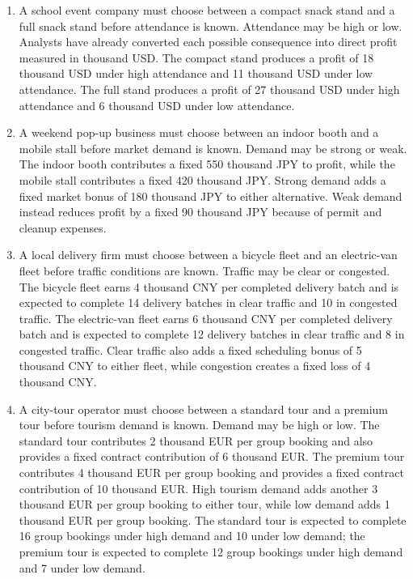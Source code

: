 	\begin{enumerate}[leftmargin=0.22in]
		
		\item
		A school event company must choose between a compact snack stand and a full snack stand before attendance is known. Attendance may be high or low. Analysts have already converted each possible consequence into direct profit measured in thousand USD. The compact stand produces a profit of 18 thousand USD under high attendance and 11 thousand USD under low attendance. The full stand produces a profit of 27 thousand USD under high attendance and 6 thousand USD under low attendance.
		
		\item
		A weekend pop-up business must choose between an indoor booth and a mobile stall before market demand is known. Demand may be strong or weak. The indoor booth contributes a fixed 550 thousand JPY to profit, while the mobile stall contributes a fixed 420 thousand JPY. Strong demand adds a fixed market bonus of 180 thousand JPY to either alternative. Weak demand instead reduces profit by a fixed 90 thousand JPY because of permit and cleanup expenses.
		
		\item
		A local delivery firm must choose between a bicycle fleet and an electric-van fleet before traffic conditions are known. Traffic may be clear or congested. The bicycle fleet earns 4 thousand CNY per completed delivery batch and is expected to complete 14 delivery batches in clear traffic and 10 in congested traffic. The electric-van fleet earns 6 thousand CNY per completed delivery batch and is expected to complete 12 delivery batches in clear traffic and 8 in congested traffic. Clear traffic also adds a fixed scheduling bonus of 5 thousand CNY to either fleet, while congestion creates a fixed loss of 4 thousand CNY.
		
		\item
		A city-tour operator must choose between a standard tour and a premium tour before tourism demand is known. Demand may be high or low. The standard tour contributes 2 thousand EUR per group booking and also provides a fixed contract contribution of 6 thousand EUR. The premium tour contributes 4 thousand EUR per group booking and provides a fixed contract contribution of 10 thousand EUR. High tourism demand adds another 3 thousand EUR per group booking to either tour, while low demand adds 1 thousand EUR per group booking. The standard tour is expected to complete 16 group bookings under high demand and 10 under low demand; the premium tour is expected to complete 12 group bookings under high demand and 7 under low demand.
		

\end{enumerate}
